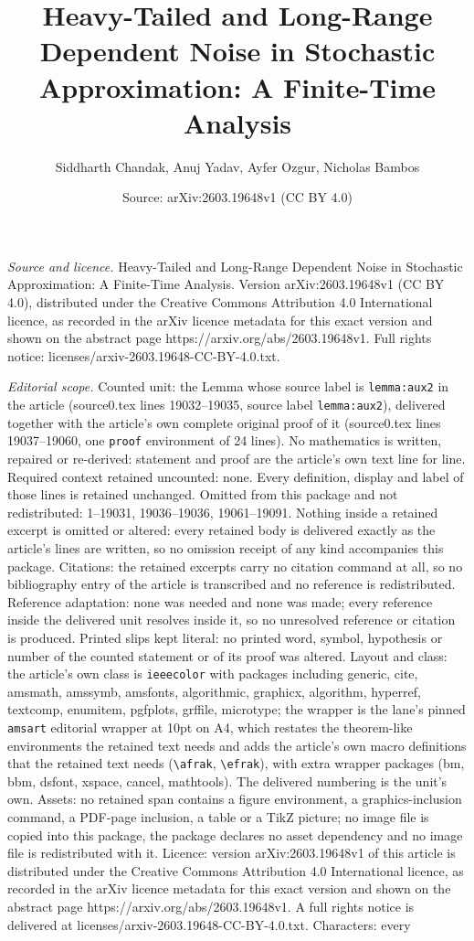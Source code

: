 \documentclass[10pt,a4paper]{amsart}
\title[Heavy-Tailed and Long-Range Dependent Noise in Stochastic Ap]{Heavy-Tailed and Long-Range Dependent Noise in Stochastic Approximation: A Finite-Time Analysis}
\author{Siddharth Chandak, Anuj Yadav, Ayfer Ozgur, Nicholas Bambos}
\date{Source: arXiv:2603.19648v1 (CC BY 4.0)}
\begin{document}
\maketitle

\noindent\emph{Source and licence.} Heavy-Tailed and Long-Range Dependent Noise in Stochastic Approximation: A Finite-Time Analysis. Version arXiv:2603.19648v1 (CC BY 4.0), distributed under the Creative Commons Attribution 4.0 International licence, as recorded in the arXiv licence metadata for this exact version and shown on the abstract page https://arxiv.org/abs/2603.19648v1. Full rights notice: licenses/arxiv-2603.19648-CC-BY-4.0.txt.\par\smallskip

\noindent\textit{Editorial scope.} Counted unit: the Lemma whose source label is \texttt{lemma:aux2} in the article (source0.tex lines 19032--19035, source label \texttt{lemma:aux2}), delivered together with the article's own complete original proof of it (source0.tex lines 19037--19060, one \texttt{proof} environment of 24 lines). No mathematics is written, repaired or re-derived: statement and proof are the article's own text line for line. Required context retained uncounted: none. Every definition, display and label of those lines is retained unchanged. Omitted from this package and not redistributed: 1--19031, 19036--19036, 19061--19091. Nothing inside a retained excerpt is omitted or altered: every retained body is delivered exactly as the article's lines are written, so no omission receipt of any kind accompanies this package. Citations: the retained excerpts carry no citation command at all, so no bibliography entry of the article is transcribed and no reference is redistributed. Reference adaptation: none was needed and none was made; every reference inside the delivered unit resolves inside it, so no unresolved reference or citation is produced. Printed slips kept literal: no printed word, symbol, hypothesis or number of the counted statement or of its proof was altered. Layout and class: the article's own class is \texttt{ieeecolor} with packages including generic, cite, amsmath, amssymb, amsfonts, algorithmic, graphicx, algorithm, hyperref, textcomp, enumitem, pgfplots, grffile, microtype; the wrapper is the lane's pinned \texttt{amsart} editorial wrapper at 10pt on A4, which restates the theorem-like environments the retained text needs and adds the article's own macro definitions that the retained text needs (\texttt{\textbackslash afrak}, \texttt{\textbackslash efrak}), with extra wrapper packages (bm, bbm, dsfont, xspace, cancel, mathtools). The delivered numbering is the unit's own. Assets: no retained span contains a figure environment, a graphics-inclusion command, a PDF-page inclusion, a table or a TikZ picture; no image file is copied into this package, the package declares no asset dependency and no image file is redistributed with it. Licence: version arXiv:2603.19648v1 of this article is distributed under the Creative Commons Attribution 4.0 International licence, as recorded in the arXiv licence metadata for this exact version and shown on the abstract page https://arxiv.org/abs/2603.19648v1. A full rights notice is delivered at licenses/arxiv-2603.19648-CC-BY-4.0.txt. Characters: every 
\end{document}
